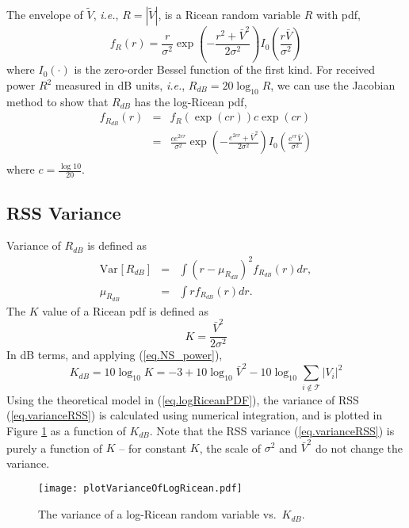 \documentclass[journal]{IEEEtran}
\newcommand{\Var}[2]{\mbox{Var}_{#1}\left[ {#2} \right]}
\newcommand{\ie}{{\it i.e.}}
\newcommand{\nnn}[0]{\nonumber \\ }
\newcommand{\nn}[0]{\nonumber }
\begin{document}
The envelope of $\tilde{V}$, \ie, $R = |\tilde{V}|$, is a Ricean random variable $R$ with pdf,
\begin{equation}
f_R(r) = \frac{r}{\sigma^2} \exp\left(-\frac{r^2+\bar{V}^2}{2\sigma^2} \right) I_0 \left(\frac{r \bar{V}}{\sigma^2} \right)
\end{equation} 
where $I_0(\cdot)$ is the zero-order Bessel function of the first kind. For received power $R^2$ measured in dB units, \ie, $R_{dB} = 20 \log_{10} R$, we can use the Jacobian method to show that $R_{dB}$ has the log-Ricean pdf,
\begin{eqnarray} \label{eq.logRiceanPDF}
f_{R_{dB}}(r) &=& f_R(\exp(c r )) c \exp(cr) \nn \\
&=& \frac{c e^{2 c r}}{\sigma^2} \exp\left(-\frac{e^{2 c r}+\bar{V}^2}{2\sigma^2} \right)
                I_0 \left(\frac{e^{c r} \bar{V}}{\sigma^2} \right)  \nnn
\end{eqnarray}
where $c = \frac{\log 10}{20}$.

\subsection{RSS Variance}

Variance of $R_{dB}$ is defined as
\begin{eqnarray} \label{eq.varianceRSS}
\Var{}{R_{dB}} &=& \int \left(r-\mu_{R_{dB}} \right)^2 f_{R_{dB}}(r) dr , \nnn
\mu_{R_{dB}} &=& \int r f_{R_{dB}}(r) dr . 
\end{eqnarray}
The $K$ value of a Ricean pdf is defined as \cite{durgin02}
\begin{equation} \label{eq.K}
 K  = \frac{\bar{V}^2}{2\sigma^2}
\end{equation}
In dB terms, and applying (\ref{eq.NS_power}),
\begin{equation} \label{eq.K_dB}
K_{dB} = 10\log_{10} K  = - 3  + 10 \log_{10} \bar{V}^2 - 10 \log_{10} \sum_{i\notin \mathcal{T}} |V_i |^2
\end{equation}
Using the theoretical model in (\ref{eq.logRiceanPDF}), the variance of RSS (\ref{eq.varianceRSS}) is calculated using numerical integration, and is plotted in Figure \ref{fig.plotVarianceOfLogRicean} as a function of $K_{dB}$.  Note that the RSS variance (\ref{eq.varianceRSS}) is purely a function of $K$ -- for constant $K$, the scale of $\sigma^2$ and $\bar{V}^2$ do not change the variance.

\begin{figure}[htbp]
\centering
\texttt{[image: plotVarianceOfLogRicean.pdf]}
\caption{The variance of a log-Ricean random variable vs.~$K_{dB}$.}\label{fig.plotVarianceOfLogRicean}
\end{figure}
\end{document}
